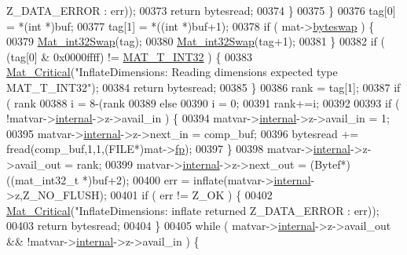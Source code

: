 \begin{DoxyCode}
{{{{{{{{{{      Z\_DATA\_ERROR : err));
00373             \textcolor{keywordflow}{return} bytesread;
00374         \}
00375     \}
00376     tag[0] = *(\textcolor{keywordtype}{int} *)buf;
00377     tag[1] = *((\textcolor{keywordtype}{int} *)buf+1);
00378     \textcolor{keywordflow}{if} ( mat->\hyperlink{struct__mat__t_a99d207977af5e04941ace56d71817a40}{byteswap} ) \{
00379         \hyperlink{endian_8c_a2e0153996243f0a34df9a5286087cfa3}{Mat\_int32Swap}(tag);
00380         \hyperlink{endian_8c_a2e0153996243f0a34df9a5286087cfa3}{Mat\_int32Swap}(tag+1);
00381     \}
00382     \textcolor{keywordflow}{if} ( (tag[0] & 0x0000ffff) != \hyperlink{group___m_a_t_ggacf7b3b879282b7ab3a51190e49bf3453a83e06a68320726c6572bfbb9f3addb1d}{MAT\_T\_INT32} ) \{
00383         \hyperlink{group__mat__util_gaf51f2bfbb5580f575e4dd79757e2b80c}{Mat\_Critical}(\textcolor{stringliteral}{"InflateDimensions: Reading dimensions expected type MAT\_T\_INT32"});
00384         \textcolor{keywordflow}{return} bytesread;
00385     \}
00386     rank = tag[1];
00387     \textcolor{keywordflow}{if} ( rank %
00388         i = 8-(rank %
00389     \textcolor{keywordflow}{else}
00390         i = 0;
00391     rank+=i;
00392 
00393     \textcolor{keywordflow}{if} ( !matvar->\hyperlink{group___m_a_t_a6e97e3ed9f40c49322c18561c2a94e92}{internal}->z->avail\_in ) \{
00394         matvar->\hyperlink{group___m_a_t_a6e97e3ed9f40c49322c18561c2a94e92}{internal}->z->avail\_in = 1;
00395         matvar->\hyperlink{group___m_a_t_a6e97e3ed9f40c49322c18561c2a94e92}{internal}->z->next\_in = comp\_buf;
00396         bytesread += fread(comp\_buf,1,1,(FILE*)mat->\hyperlink{struct__mat__t_a85f562e407ca9ad4d2a6e14f839432b7}{fp});
00397     \}
00398     matvar->\hyperlink{group___m_a_t_a6e97e3ed9f40c49322c18561c2a94e92}{internal}->z->avail\_out = rank;
00399     matvar->\hyperlink{group___m_a_t_a6e97e3ed9f40c49322c18561c2a94e92}{internal}->z->next\_out = (Bytef*)((mat\_int32\_t *)buf+2);
00400     err = inflate(matvar->\hyperlink{group___m_a_t_a6e97e3ed9f40c49322c18561c2a94e92}{internal}->z,Z\_NO\_FLUSH);
00401     \textcolor{keywordflow}{if} ( err != Z\_OK ) \{
00402         \hyperlink{group__mat__util_gaf51f2bfbb5580f575e4dd79757e2b80c}{Mat\_Critical}(\textcolor{stringliteral}{"InflateDimensions: inflate returned %
      Z\_DATA\_ERROR : err));
00403         \textcolor{keywordflow}{return} bytesread;
00404     \}
00405     \textcolor{keywordflow}{while} ( matvar->\hyperlink{group___m_a_t_a6e97e3ed9f40c49322c18561c2a94e92}{internal}->z->avail\_out && !matvar->\hyperlink{group___m_a_t_a6e97e3ed9f40c49322c18561c2a94e92}{internal}->z->avail\_in ) \{
}}}}}}}}}}}
\end{DoxyCode}
